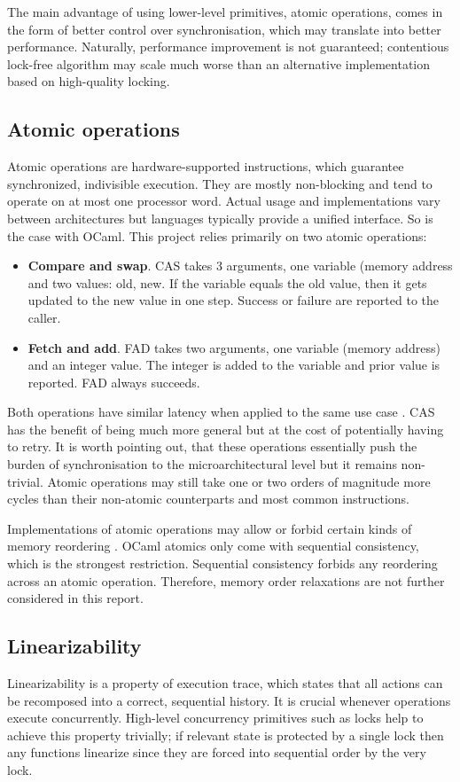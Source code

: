 \documentclass[12pt,a4paper,twoside]{report}
\begin{document}
The main advantage of using lower-level primitives, atomic operations, comes in the form of better control over synchronisation, which may translate into better performance. Naturally, performance improvement is not guaranteed; contentious lock-free algorithm may scale much worse than an alternative implementation based on high-quality locking. 

\subsection{Atomic operations}
Atomic operations are hardware-supported instructions, which guarantee synchronized, indivisible execution. They are mostly non-blocking and tend to operate on at most one processor word. Actual usage and implementations vary between architectures but languages typically provide a unified interface. So is the case with OCaml. This project relies primarily on two atomic operations:
\begin{itemize}
    \item \textbf{Compare and swap}. CAS takes 3 arguments, one variable (memory address and two values: old, new. If the variable equals the old value, then it gets updated to the new value in one step. Success or failure are reported to the caller.  
    \item \textbf{Fetch and add}. FAD takes two arguments, one variable (memory address) and an integer value. The integer is added to the variable and prior value is reported. FAD always succeeds.  
\end{itemize}

Both operations have similar latency when applied to the same use case \cite{fad-cas-speed}. CAS has the benefit of being much more general but at the cost of potentially having to retry. It is worth pointing out, that these operations essentially push the burden of synchronisation to the microarchitectural level but it remains non-trivial. Atomic operations may still take one or two orders of magnitude more cycles than their non-atomic counterparts and most common instructions. 

Implementations of atomic operations may allow or forbid certain kinds of memory reordering \cite{memoryor11:online}. OCaml atomics only come with sequential consistency, which is the strongest restriction. Sequential consistency forbids any reordering across an atomic operation. Therefore, memory order relaxations are not further considered in this report.

\subsection{Linearizability}
\label{section:linearizability}
Linearizability is a property of execution trace, which states that all actions can be recomposed into a correct, sequential history. It is crucial whenever operations execute concurrently. High-level concurrency primitives such as locks help to achieve this property trivially; if relevant state is protected by a single lock then any functions linearize since they are forced into sequential order by the very lock. 
\end{document}

